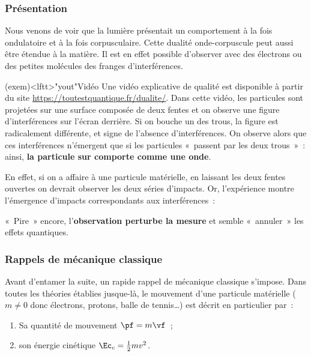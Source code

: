 \documentclass[../../main/main.tex]{subfiles}
\begin{document}
\subsubsection{Présentation}
\label{sssec:vidquantique}
Nous venons de voir que la lumière présentait un comportement à la fois
ondulatoire et à la fois corpusculaire. Cette dualité onde-corpuscule peut aussi
être étendue à la matière. Il est en effet possible d'observer avec des
électrons ou des petites molécules des franges d'interférences.
\begin{tcb}(exem)<lftt>"yout"{Vidéo}
	Une vidéo explicative de qualité est disponible à partir du site
	\url{https://toutestquantique.fr/dualite/}. Dans cette vidéo, les particules
	sont projetées sur une surface composée de deux fentes et on observe une figure
	d'interférences sur l'écran derrière. Si on bouche un des trous, la figure est
	radicalement différente, et signe de l'absence d'interférences.
	\smallbreak
	On observe alors que ces interférences n'émergent que si les particules
	«~passent par les deux trous~»~: ainsi, \textbf{la particule sur comporte
		comme une onde}.
\end{tcb}

En effet, si on a affaire à une particule matérielle, en laissant les deux
fentes ouvertes on devrait observer les deux séries d'impacts. Or, l'expérience
montre l'émergence d'impacts correspondants aux interférences~:
\begin{center}
\end{center}
«~Pire~» encore, l'\textbf{observation perturbe la mesure} et semble «~annuler~»
les effets quantiques.

\subsubsection{Rappels de mécanique classique}
\label{sssec:rapmeca}
Avant d'entamer la suite, un rapide rappel de mécanique classique s'impose. Dans
toutes les théories établies jusque-là, le mouvement d'une
particule matérielle ($m \neq 0$ donc électrons, protons, balle de tennis…) est
décrit en particulier par~:
\begin{enumerate}
	\item Sa quantité de mouvement $\pf = m\vf$~;
	\item son énergie cinétique $\Ec_c = \frac{1}{2} mv^2$.
\end{enumerate}
\end{document}
